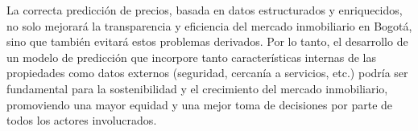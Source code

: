 La correcta predicción de precios, basada en datos estructurados y enriquecidos, no solo mejorará la transparencia y eficiencia del mercado inmobiliario en Bogotá, sino que también evitará estos problemas derivados. Por lo tanto, el desarrollo de un modelo de predicción que incorpore tanto características internas de las propiedades como datos externos (seguridad, cercanía a servicios, etc.) podría ser fundamental para la sostenibilidad y el crecimiento del mercado inmobiliario, promoviendo una mayor equidad y una mejor toma de decisiones por parte de todos los actores involucrados.
